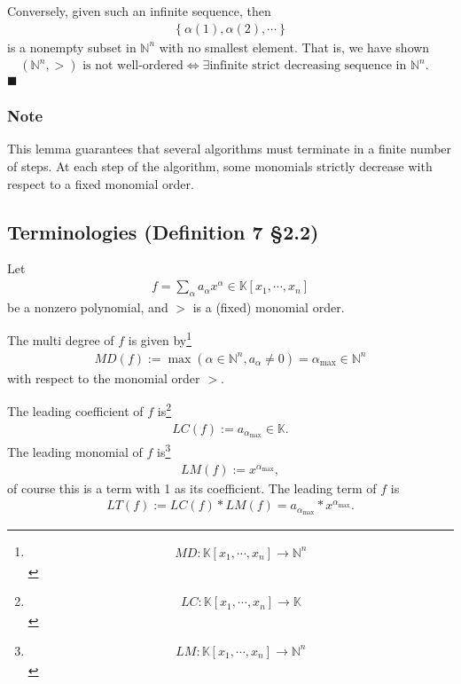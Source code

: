 \documentclass[11pt]{book}
\begin{document}
Conversely, given such an infinite sequence, then
\begin{eqnarray}
\left\{\alpha(1), \alpha(2), \cdots \right\}
\end{eqnarray}
is a nonempty subset in $\mathbb{N}^n$ with no smallest element.
That is, we have shown
\begin{eqnarray}
(\mathbb{N}^n, >) \text{ is not well-ordered} \Leftrightarrow \exists \text{infinite strict decreasing sequence in } \mathbb{N}^n. \quad
\end{eqnarray}
$\blacksquare$

\subsubsection{Note}
This lemma guarantees that several algorithms must terminate in a finite number of steps.
At each step of the algorithm, some monomials strictly decrease with respect to a fixed monomial order.

\subsection{Terminologies (Definition 7 \S2.2)}
Let 
\begin{eqnarray}
f = \sum_{\alpha} a_\alpha x^\alpha \in \mathbb{K}[x_1, \cdots, x_n]
\end{eqnarray}
be a nonzero polynomial, and $>$ is a (fixed) monomial order.

The multi degree of $f$ is given by\footnote{
\begin{eqnarray}
MD : \mathbb{K}[x_1, \cdots, x_n] \to \mathbb{N}^n
\end{eqnarray}
}
\begin{eqnarray}
\label{multiDegree}
MD(f) := \max \left( \alpha \in \mathbb{N}^n, a_\alpha \neq 0 \right) = \alpha_{\max} \in \mathbb{N}^n
\end{eqnarray}
with respect to the monomial order $>$. 

The leading coefficient of $f$ is\footnote{
\begin{eqnarray}
LC : \mathbb{K}[x_1, \cdots, x_n] \to \mathbb{K}
\end{eqnarray}
}
\begin{eqnarray}
LC(f) := a_{\alpha_{\max}} \in \mathbb{K}.
\end{eqnarray}
The leading monomial of $f$ is\footnote{
\begin{eqnarray}
LM : \mathbb{K}[x_1, \cdots, x_n] \to \mathbb{N}^n
\end{eqnarray}
}
\begin{eqnarray}
LM(f) := x^{\alpha_{\max}},
\end{eqnarray}
of course this is a term with 1 as its coefficient.
The leading term of $f$ is
\begin{eqnarray}
LT(f) := LC(f) * LM(f) = a_{\alpha_{\max}} * x^{\alpha_{\max}}.
\end{eqnarray}
\end{document}
